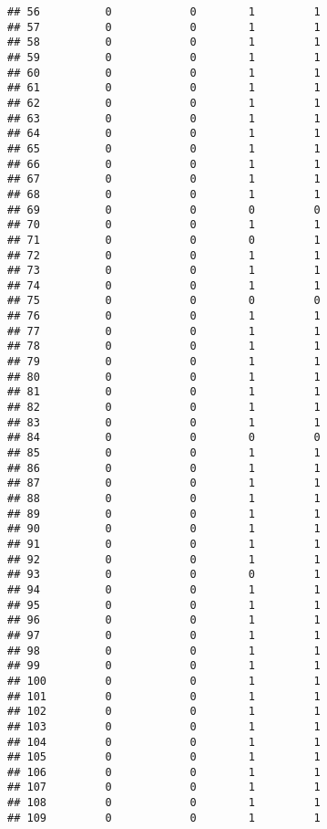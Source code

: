 \documentclass[
]{article}
\begin{document}
\begin{verbatim}
## 56          0            0        1         1
## 57          0            0        1         1
## 58          0            0        1         1
## 59          0            0        1         1
## 60          0            0        1         1
## 61          0            0        1         1
## 62          0            0        1         1
## 63          0            0        1         1
## 64          0            0        1         1
## 65          0            0        1         1
## 66          0            0        1         1
## 67          0            0        1         1
## 68          0            0        1         1
## 69          0            0        0         0
## 70          0            0        1         1
## 71          0            0        0         1
## 72          0            0        1         1
## 73          0            0        1         1
## 74          0            0        1         1
## 75          0            0        0         0
## 76          0            0        1         1
## 77          0            0        1         1
## 78          0            0        1         1
## 79          0            0        1         1
## 80          0            0        1         1
## 81          0            0        1         1
## 82          0            0        1         1
## 83          0            0        1         1
## 84          0            0        0         0
## 85          0            0        1         1
## 86          0            0        1         1
## 87          0            0        1         1
## 88          0            0        1         1
## 89          0            0        1         1
## 90          0            0        1         1
## 91          0            0        1         1
## 92          0            0        1         1
## 93          0            0        0         1
## 94          0            0        1         1
## 95          0            0        1         1
## 96          0            0        1         1
## 97          0            0        1         1
## 98          0            0        1         1
## 99          0            0        1         1
## 100         0            0        1         1
## 101         0            0        1         1
## 102         0            0        1         1
## 103         0            0        1         1
## 104         0            0        1         1
## 105         0            0        1         1
## 106         0            0        1         1
## 107         0            0        1         1
## 108         0            0        1         1
## 109         0            0        1         1

\end{verbatim}
\end{document}
